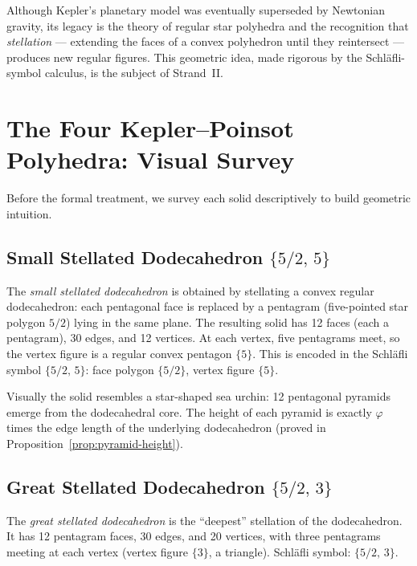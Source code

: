 Although Kepler's planetary model was eventually superseded by
Newtonian gravity, its legacy is the theory of regular star
polyhedra and the recognition that \emph{stellation} —
extending the faces of a convex polyhedron until they
reintersect — produces new regular figures.  This geometric
idea, made rigorous by the Schläfli-symbol calculus, is the
subject of Strand~II.

\section{The Four Kepler–Poinsot Polyhedra: Visual Survey}
\label{sec:visual-survey}

Before the formal treatment, we survey each solid descriptively
to build geometric intuition.

\subsection{Small Stellated Dodecahedron \texorpdfstring{$\{5/2,\,5\}$}{5/2,5}}
\label{ssec:small-stellated-dodecahedron}

The \emph{small stellated dodecahedron} is obtained by
stellating a convex regular dodecahedron: each pentagonal face
is replaced by a pentagram (five-pointed star polygon \(5/2\))
lying in the same plane.  The resulting solid has 12 faces
(each a pentagram), 30 edges, and 12 vertices.  At each vertex,
five pentagrams meet, so the vertex figure is a regular convex
pentagon \(\{5\}\).  This is encoded in the Schläfli symbol
\(\{5/2,\,5\}\): face polygon \(\{5/2\}\), vertex figure
\(\{5\}\).

Visually the solid resembles a star-shaped sea urchin: 12
pentagonal pyramids emerge from the dodecahedral core.  The
height of each pyramid is exactly \(\varphi\) times the edge
length of the underlying dodecahedron (proved in
Proposition~\ref{prop:pyramid-height}).

\subsection{Great Stellated Dodecahedron \texorpdfstring{$\{5/2,\,3\}$}{5/2,3}}
\label{ssec:great-stellated-dodecahedron}

The \emph{great stellated dodecahedron} is the ``deepest''
stellation of the dodecahedron.  It has 12 pentagram faces, 30
edges, and 20 vertices, with three pentagrams meeting at each
vertex (vertex figure \(\{3\}\), a triangle).  Schläfli symbol:
\(\{5/2,\,3\}\).

